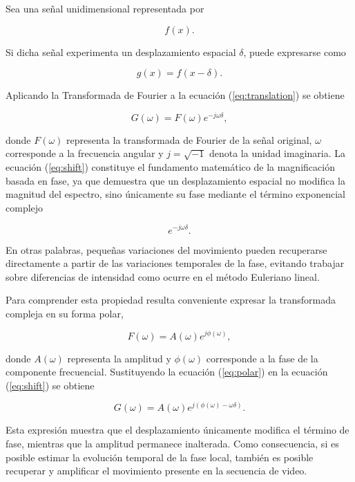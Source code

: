 Sea una señal unidimensional representada por

\begin{equation}
f(x).
\end{equation}

Si dicha señal experimenta un desplazamiento espacial $\delta$, puede expresarse como

\begin{equation}
g(x)=f(x-\delta).
\label{eq:translation}
\end{equation}

Aplicando la Transformada de Fourier a la ecuación (\ref{eq:translation}) se obtiene

\begin{equation}
G(\omega)
=
F(\omega)e^{-j\omega\delta},
\label{eq:shift}
\end{equation}

donde $F(\omega)$ representa la transformada de Fourier de la señal original, $\omega$ corresponde a la frecuencia angular y $j=\sqrt{-1}$ denota la unidad imaginaria. La ecuación (\ref{eq:shift}) constituye el fundamento matemático de la magnificación basada en fase, ya que demuestra que un desplazamiento espacial no modifica la magnitud del espectro, sino únicamente su fase mediante el término exponencial complejo

\[
e^{-j\omega\delta}.
\]

En otras palabras, pequeñas variaciones del movimiento pueden recuperarse directamente a partir de las variaciones temporales de la fase, evitando trabajar sobre diferencias de intensidad como ocurre en el método Euleriano lineal.

Para comprender esta propiedad resulta conveniente expresar la transformada compleja en su forma polar,

\begin{equation}
F(\omega)
=
A(\omega)e^{j\phi(\omega)},
\label{eq:polar}
\end{equation}

donde $A(\omega)$ representa la amplitud y $\phi(\omega)$ corresponde a la fase de la componente frecuencial. Sustituyendo la ecuación (\ref{eq:polar}) en la ecuación (\ref{eq:shift}) se obtiene

\begin{equation}
G(\omega)
=
A(\omega)
e^{j(\phi(\omega)-\omega\delta)}.
\label{eq:phase_shift}
\end{equation}

Esta expresión muestra que el desplazamiento únicamente modifica el término de fase, mientras que la amplitud permanece inalterada. Como consecuencia, si es posible estimar la evolución temporal de la fase local, también es posible recuperar y amplificar el movimiento presente en la secuencia de video.

